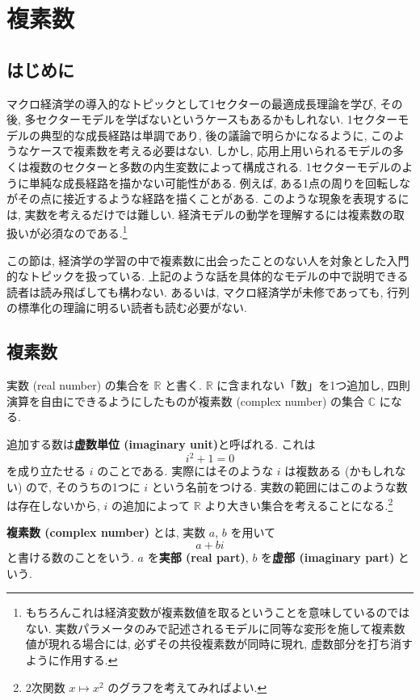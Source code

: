 \documentclass[a4paper]{scrbook}
\theoremstyle{definition}
\let\BeginKnitrBlock\begin \let\EndKnitrBlock\end
\begin{document}
\chapter{複素数}\label{complexnumbers}

\section{はじめに}

マクロ経済学の導入的なトピックとして1セクターの最適成長理論を学び,
その後, 多セクターモデルを学ばないというケースもあるかもしれない.
1セクターモデルの典型的な成長経路は単調であり,
後の議論で明らかになるように,
このようなケースで複素数を考える必要はない. しかし,
応用上用いられるモデルの多くは複数のセクターと多数の内生変数によって構成される.
1セクターモデルのように単純な成長経路を描かない可能性がある. 例えば,
ある1点の周りを回転しながその点に接近するような経路を描くことがある.
このような現象を表現するには, 実数を考えるだけでは難しい.
経済モデルの動学を理解するには複素数の取扱いが必須なのである.\footnote{もちろんこれは経済変数が複素数値を取るということを意味しているのではない.
  実数パラメータのみで記述されるモデルに同等な変形を施して複素数値が現れる場合には,
  必ずその共役複素数が同時に現れ, 虚数部分を打ち消すように作用する.}

この節は,
経済学の学習の中で複素数に出会ったことのない人を対象とした入門的なトピックを扱っている.
上記のような話を具体的なモデルの中で説明できる読者は読み飛ばしても構わない.
あるいは, マクロ経済学が未修であっても,
行列の標準化の理論に明るい読者も読む必要がない.

\section{複素数}

実数 (real number) の集合を \(\mathbb R\) と書く. \(\mathbb R\)
に含まれない「数」を1つ追加し,
四則演算を自由にできるようにしたものが複素数 (complex number) の集合
\(\mathbb C\) になる.

追加する数は\textbf{虚数単位 (imaginary unit)}と呼ばれる. これは \[
  i^2 + 1 = 0
\] を成り立たせる \(i\) のことである. 実際にはそのような \(i\)
は複数ある (かもしれない) ので, そのうちの1つに \(i\)
という名前をつける. 実数の範囲にはこのような数は存在しないから, \(i\)
の追加によって \(\mathbb R\) より大きい集合を考えることになる.\footnote{2次関数
  \(x \mapsto x^2\) のグラフを考えてみればよい.}

\BeginKnitrBlock{definition}
\protect\hypertarget{def:unnamed-chunk-15}{}{\label{def:unnamed-chunk-15}}\textbf{複素数
(complex number)} とは, 実数 \(a\), \(b\) を用いて \[
  a + bi
\] と書ける数のことをいう. \(a\) を\textbf{実部 (real part)}, \(b\)
を\textbf{虚部 (imaginary part)} という.
\EndKnitrBlock{definition}
\end{document}
